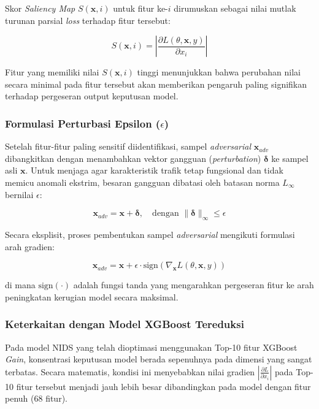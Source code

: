 \documentclass[11pt, a4paper]{article}
\begin{document}
Skor \textit{Saliency Map} $S(\mathbf{x}, i)$ untuk fitur ke-$i$ dirumuskan sebagai nilai mutlak turunan parsial \textit{loss} terhadap fitur tersebut:

\begin{equation}
S(\mathbf{x}, i) = \left| \frac{\partial L(\theta, \mathbf{x}, y)}{\partial x_i} \right|
\end{equation}

Fitur yang memiliki nilai $S(\mathbf{x}, i)$ tinggi menunjukkan bahwa perubahan nilai secara minimal pada fitur tersebut akan memberikan pengaruh paling signifikan terhadap pergeseran output keputusan model.

\subsubsection{Formulasi Perturbasi Epsilon ($\epsilon$)}
Setelah fitur-fitur paling sensitif diidentifikasi, sampel \textit{adversarial} $\mathbf{x}_{adv}$ dibangkitkan dengan menambahkan vektor gangguan (\textit{perturbation}) $\boldsymbol{\delta}$ ke sampel asli $\mathbf{x}$. Untuk menjaga agar karakteristik trafik tetap fungsional dan tidak memicu anomali ekstrim, besaran gangguan dibatasi oleh batasan norma $L_\infty$ bernilai $\epsilon$:

\begin{equation}
\mathbf{x}_{adv} = \mathbf{x} + \boldsymbol{\delta}, \quad \text{dengan } \|\boldsymbol{\delta}\|_\infty \le \epsilon
\end{equation}

Secara eksplisit, proses pembentukan sampel \textit{adversarial} mengikuti formulasi arah gradien:

\begin{equation}
\mathbf{x}_{adv} = \mathbf{x} + \epsilon \cdot \text{sign}\left( \nabla_{\mathbf{x}} L(\theta, \mathbf{x}, y) \right)
\end{equation}

di mana $\text{sign}(\cdot)$ adalah fungsi tanda yang mengarahkan pergeseran fitur ke arah peningkatan kerugian model secara maksimal.

\subsubsection{Keterkaitan dengan Model XGBoost Tereduksi}
Pada model NIDS yang telah dioptimasi menggunakan Top-10 fitur XGBoost \textit{Gain}, konsentrasi keputusan model berada sepenuhnya pada dimensi yang sangat terbatas. Secara matematis, kondisi ini menyebabkan nilai gradien $\left| \frac{\partial L}{\partial x_i} \right|$ pada Top-10 fitur tersebut menjadi jauh lebih besar dibandingkan pada model dengan fitur penuh ($68$ fitur). 
\end{document}
